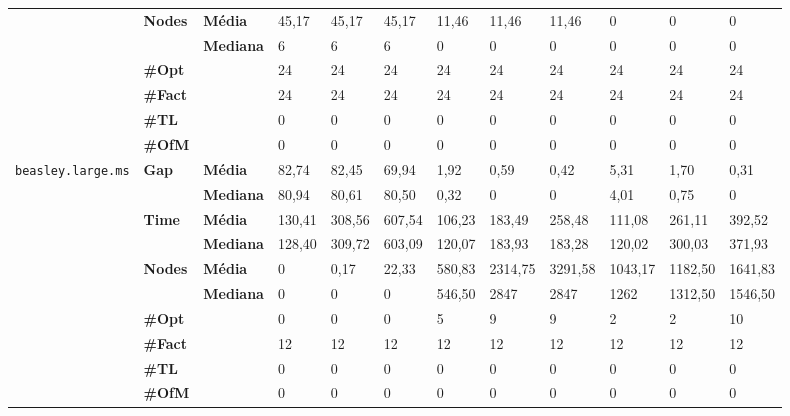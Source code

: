 \begin{footnotesize}
\begin{tabular}{c@{\hskip 0.2cm}l@{\hskip 0.1cm}l|lll|lll|lll}
\cline{2-12}
 & \multirow{2}{*}{\textbf{Nodes}} & \textbf{Média} & 45,17 & 45,17 & 45,17 & 11,46 & 11,46 & 11,46 & 0 & 0 & 0 \\
 & & \textbf{Mediana} & 6 & 6 & 6 & 0 & 0 & 0 & 0 & 0 & 0 \\
\cline{2-12}
 & \textbf{\#Opt} & & 24 & 24 & 24 & 24 & 24 & 24 & 24 & 24 & 24 \\
 & \textbf{\#Fact} & & 24 & 24 & 24 & 24 & 24 & 24 & 24 & 24 & 24 \\
 & \textbf{\#TL} & & 0 & 0 & 0 & 0 & 0 & 0 & 0 & 0 & 0 \\
 & \textbf{\#OfM} & & 0 & 0 & 0 & 0 & 0 & 0 & 0 & 0 & 0 \\
\hline
\multirow{7}{*}{\texttt{beasley.large.ms}} & \multirow{2}{*}{\textbf{Gap}} & \textbf{Média} & 82,74 & 82,45 & 69,94 & 1,92 & 0,59 & 0,42 & 5,31 & 1,70 & 0,31 \\
 & & \textbf{Mediana} & 80,94 & 80,61 & 80,50 & 0,32 & 0 & 0 & 4,01 & 0,75 & 0 \\
\cline{2-12}
 & \multirow{2}{*}{\textbf{Time}} & \textbf{Média} & 130,41 & 308,56 & 607,54 & 106,23 & 183,49 & 258,48 & 111,08 & 261,11 & 392,52 \\
 & & \textbf{Mediana} & 128,40 & 309,72 & 603,09 & 120,07 & 183,93 & 183,28 & 120,02 & 300,03 & 371,93 \\
\cline{2-12}
 & \multirow{2}{*}{\textbf{Nodes}} & \textbf{Média} & 0 & 0,17 & 22,33 & 580,83 & 2314,75 & 3291,58 & 1043,17 & 1182,50 & 1641,83 \\
 & & \textbf{Mediana} & 0 & 0 & 0 & 546,50 & 2847 & 2847 & 1262 & 1312,50 & 1546,50 \\
\cline{2-12}
 & \textbf{\#Opt} & & 0 & 0 & 0 & 5 & 9 & 9 & 2 & 2 & 10 \\
 & \textbf{\#Fact} & & 12 & 12 & 12 & 12 & 12 & 12 & 12 & 12 & 12 \\
 & \textbf{\#TL} & & 0 & 0 & 0 & 0 & 0 & 0 & 0 & 0 & 0 \\
 & \textbf{\#OfM} & & 0 & 0 & 0 & 0 & 0 & 0 & 0 & 0 & 0 \\
	\end{tabular}
	\end{footnotesize}

